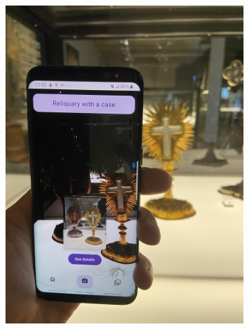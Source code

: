 \begin{figure}[h]
    \centering

    \begin{subfigure}[b]{0.4\textwidth}
        \centering
        \includegraphics[angle=270, width=\textwidth]{img/test-example-1.jpg}
    \end{subfigure}
    \hfill
    \begin{subfigure}[b]{0.4\textwidth}
        \centering

\end{subfigure}
\end{figure}
